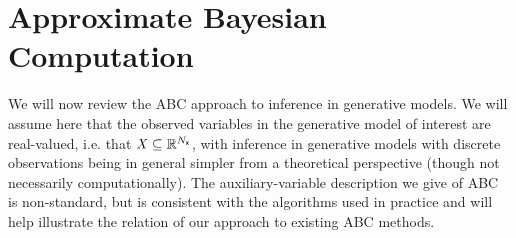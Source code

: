 \section{Approximate Bayesian Computation}\label{sec:abc}

We will now review the \ac{ABC} approach to inference in generative models. We will assume here that the observed variables in the generative model of interest are real-valued, i.e. that $\mathit{X} \subseteq \mathbb{R}^{N_{\boldsymbol{\mathsf{x}}}}$, with inference in generative models with discrete observations being in general simpler from a theoretical perspective (though not necessarily computationally). The auxiliary-variable description we give of \ac{ABC} is non-standard, but is consistent with the algorithms used in practice and will help illustrate the relation of our approach to existing \ac{ABC} methods.

